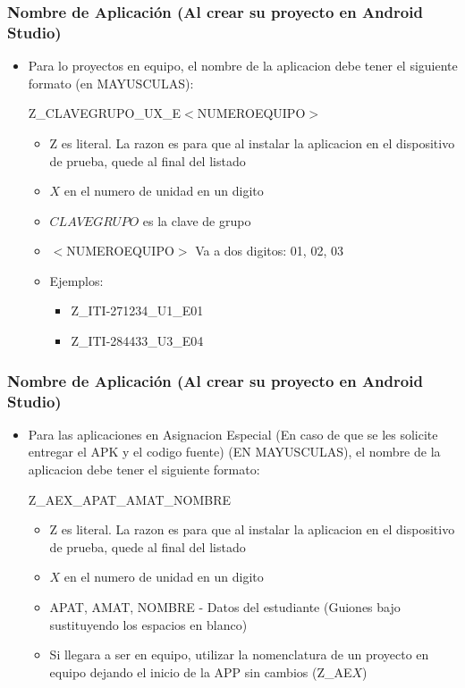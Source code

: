 \begin{frame}
\frametitle{Nombre de Aplicaci\'on (Al crear su proyecto en Android Studio)}
\begin{itemize}

\item Para lo proyectos en equipo, el nombre de la aplicacion debe tener el siguiente formato (en MAYUSCULAS):

 Z\_CLAVEGRUPO\_UX\_E$<$NUMEROEQUIPO$>$

\begin{itemize}

\item Z es literal. La razon es para que al instalar la aplicacion en el dispositivo de prueba, quede al final del listado
\item $X$ en el numero de unidad en un digito
\item $CLAVEGRUPO$ es la clave de grupo
\item $<$NUMEROEQUIPO$>$ Va a dos digitos: 01, 02, 03

\item Ejemplos:
\begin{itemize}
\item \tiny{Z\_ITI-271234\_U1\_E01}
\item \tiny{Z\_ITI-284433\_U3\_E04}
\end{itemize}

\end{itemize}

\end{itemize}


\end{frame}



\begin{frame}
\frametitle{Nombre de Aplicaci\'on (Al crear su proyecto en Android Studio)}
\begin{itemize}
\item Para las aplicaciones en Asignacion Especial (En caso de que se les solicite entregar el APK y el codigo fuente) (EN MAYUSCULAS), el nombre de la aplicacion debe tener el siguiente formato:

Z\_AEX\_APAT\_AMAT\_NOMBRE

\begin{itemize}

\item Z es literal. La razon es para que al instalar la aplicacion en el dispositivo de prueba, quede al final del listado
\item $X$ en el numero de unidad en un digito
\item APAT, AMAT, NOMBRE - Datos del estudiante (Guiones bajo sustituyendo los espacios en blanco)
\item Si llegara a ser en equipo, utilizar la nomenclatura de un proyecto en equipo dejando el inicio de la APP sin cambios (Z\_AE$X$)
\end{itemize}
\end{itemize}

\end{frame}

